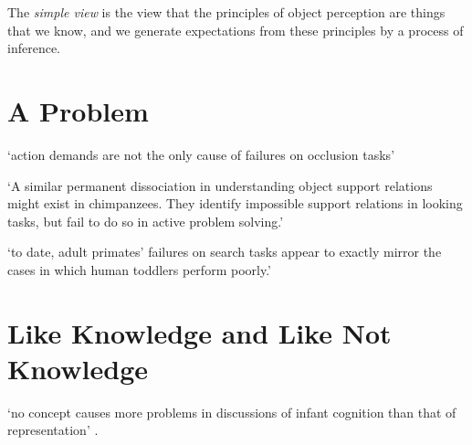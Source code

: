 \documentclass[12pt]{extarticle}
\begin{document}
\begin{multicols}{3}
The \emph{simple view} is the view that the principles of object perception are things that we know, and we generate expectations from these principles by a process of inference.
 
 
 
\section{A Problem}
 
‘action demands are not the only cause of failures on occlusion tasks’
\citep[p.\ 291]{shinskey:2012_disappearing}
 
‘A similar permanent dissociation in understanding object support relations  
might exist in chimpanzees. They identify impossible support relations in looking tasks, 
but fail to do so in active problem solving.’
\citep{gomez:2005_species}
 
‘to date, adult primates’ failures on search tasks appear to 
exactly mirror the cases in which human toddlers perform poorly.’
\citep[p.\ 17]{santos:2009_object}
 
 
 
\section{Like Knowledge and Like Not Knowledge}
 
‘no concept causes more problems in discussions of infant cognition than that of representation’
\citep{Haith:1998aq}.
 
  

 
\footnotesize 


\end{multicols}
\end{document}
